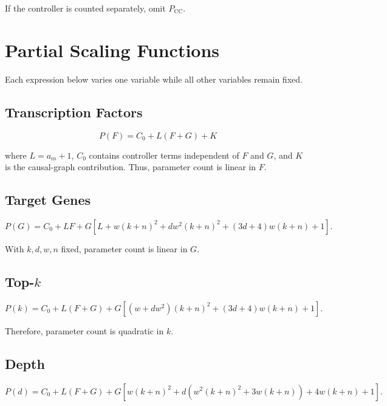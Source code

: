 \documentclass[11pt]{article}
\begin{document}
If the controller is counted separately, omit $P_{\mathrm{CC}}$.

\section{Partial Scaling Functions}

Each expression below varies one variable while all other variables remain fixed.

\subsection{Transcription Factors}

\begin{equation}
\boxed{
P(F)=C_0+L(F+G)+K
}
\end{equation}

where $L=a_m+1$, $C_0$ contains controller terms independent of $F$ and $G$, and $K$ is the
causal-graph contribution. Thus, parameter count is linear in $F$.

\subsection{Target Genes}

\begin{equation}
\boxed{
P(G)=C_0+LF
{}+G\left[L+w(k+n)^2+d w^2(k+n)^2+(3d+4)w(k+n)+1\right].
}
\end{equation}

With $k,d,w,n$ fixed, parameter count is linear in $G$.

\subsection{Top-$k$}

\begin{equation}
\boxed{
P(k)=C_0+L(F+G)
{}+G\left[(w+dw^2)(k+n)^2+(3d+4)w(k+n)+1\right].
}
\end{equation}

Therefore, parameter count is quadratic in $k$.

\subsection{Depth}

\begin{equation}
\boxed{
P(d)=C_0+L(F+G)+G\left[
w(k+n)^2
{}+d\left(w^2(k+n)^2+3w(k+n)\right)
{}+4w(k+n)+1
\right].
}
\end{equation}
\end{document}
